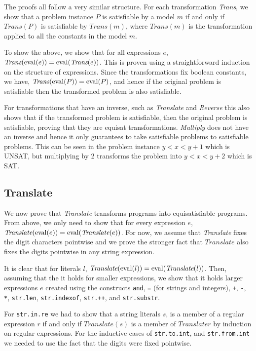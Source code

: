 The proofs all follow a very similar structure. For each transformation
\textit{Trans}, we show that a problem instance $P$ is satisfiable by a model $m$
if and only if $\textit{Trans}(P)$ is satisfiable by $\textit{Trans}(m)$, where
$\textit{Trans}(m)$ is the transformation applied to all the constants in the
model $m$.

To show the above, we show that for all expressions $e$, $\textit{Trans}(\operatorname{eval}
(e)) = \operatorname{eval} (\textit{Trans}(e))$. This is proven using a straightforward
induction on the structure of expressions. Since the transformations fix
boolean constants, we have, $\textit{Trans}(\operatorname{eval} (P)) = \operatorname{eval} (P)$, and hence
if the original problem is satisfiable then the transformed problem is also
satisfiable.

For transformations that have an inverse, such as \textit{Translate} and
\textit{Reverse} this also shows that if the transformed problem is satisfiable,
then the original problem is satisfiable, proving that they are equisat
transformations. \textit{Multiply} does not have an inverse and hence it only
guarantees to take satisfiable problems to satisfiable problems. This can be
seen in the problem instance $y<x<y+1$ which is UNSAT, but multiplying by 2
transforms the problem into $y<x<y+2$ which is SAT.

\subsection{Translate}
We now prove that \textit{Translate} transforms programs into equisatisfiable
programs. From above, we only need to show that for every expression $e$,
$\textit{Translate}(\operatorname{eval} (e)) = \operatorname{eval} (\textit{Translate}(e))$. For now, we
assume that \textit{Translate} fixes the digit characters pointwise and we prove
the stronger fact that $\textit{Translate}$ also fixes the digits pointwise in
any string expression.

It is clear that for literals $l$, $\textit{Translate}(\operatorname{eval} (l)) = \operatorname{eval}
(\textit{Translate}(l))$. Then, assuming that the it holds for smaller
expressions, we show that it holds larger expressions $e$ created using the
constructs \texttt{and}, \texttt{=} (for strings and integers), \texttt{+},
\texttt{-}, \texttt{*}, \texttt{str.len}, \texttt{str.indexof}, \texttt{str.++},
and \texttt{str.substr}.

For \texttt{str.in.re} we had to show that a string literals $s$, is a member of
a regular expression $r$ if and only if $\textit{Translate}(s)$ is a member of
$\textit{Translate}{r}$ by induction on regular expressions. For the inductive
cases of \texttt{str.to.int}, and \texttt{str.from.int} we needed to use the
fact that the digits were fixed pointwise.

